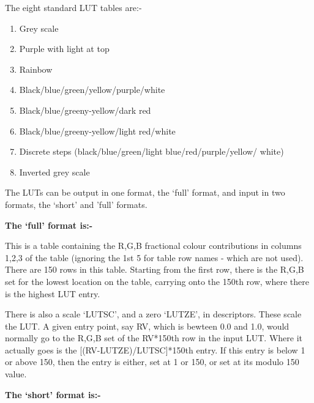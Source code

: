 {{  The eight standard LUT tables are:-
  
\begin{enumerate}                                                                             
   \item Grey scale
   \item Purple with light at top
   \item Rainbow
   \item Black/blue/green/yellow/purple/white
   \item Black/blue/greeny-yellow/dark red
   \item Black/blue/greeny-yellow/light red/white
   \item Discrete steps (black/blue/green/light blue/red/purple/yellow/
                       white)
   \item Inverted grey scale
\end{enumerate}                                                              
                                                                               
  The LUTs can be output in one format, the `full' format, and input
  in two formats, the `short' and 'full' formats.
                                                                               
  {\bf The `full' format is:-}
                                                                               
  This is a table containing the R,G,B fractional colour contributions
  in columns 1,2,3 of the table (ignoring the 1st 5 for table row
  names - which are not used). There are 150 rows in this table.
  Starting from the first row, there is the R,G,B set for the lowest
  location on the table, carrying onto the 150th row, where there is
  the highest LUT entry.
                                                                               
  There is also a scale `LUTSC', and a zero `LUTZE', in descriptors.
  These scale the LUT. A given entry point, say RV, which is
  bewteen 0.0 and 1.0, would normally go to the R,G,B set of the
  RV*150th row in the input LUT. Where it actually goes is
  the [(RV-LUTZE)/LUTSC]*150th entry. If this entry is below 1 or
  above 150, then the entry is either, set at 1 or 150, or set at
  its modulo 150 value.
                                                                               
  {\bf The `short' format is:-}
                                                                               
}}
